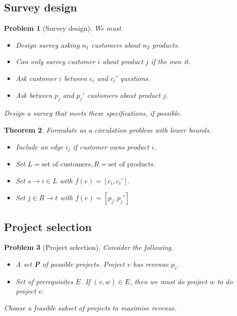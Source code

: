 \documentclass[10pt, oneside, reqno]{amsart}
\theoremstyle{plain}%
\newtheorem{thm}{Theorem}[section]
\newtheorem{prob}[thm]{Problem}
\theoremstyle{definition}
\theoremstyle{remark}
\begin{document}
\subsection{Survey design} %
\label{sub:survey_design}

\begin{prob}[Survey design] We must
	\begin{itemize}
		\item Design survey asking $n_1$ customers about $n_2$ products.
		\item Can only survey customer $i$ about product $j$ if the own it.
		\item Ask customer $i$ between $c_i$ and $c_i'$ questions.
		\item Ask between $p_j$ and $p_j'$ customers about product $j$.
	\end{itemize}
	
	Design a survey that meets these specifications, if possible.
\end{prob}

\begin{thm}
	Formulate as a circulation problem with lower bounds.
	\begin{itemize}
		\item Include an edge $i_j$ if customer owns product $i$.  
		\item Set $L = \text{set of customers}, R = \text{set of products}$.
		\item Set $s \rightarrow i \in L$ with $f(e) = [c_i, c_i']$.
		\item Set $j \in R \rightarrow t$ with $f(e) = [p_j, p_j']$
	\end{itemize}
\end{thm}




\subsection{Project selection} %
\label{sub:project_selection}


\begin{prob}[Project selection]
	Consider the following.
	\begin{itemize}
		\item A set \textbf{P} of possible projects.  Project $v$ has revenue $p_v$.
		\item Set of prerequisites $E$.  If $(v,w) \in E$, then we must do project $w$ to do project $v$.  
	\end{itemize}
	
	Choose a feasible subset of projects to maximise revenue.
\end{prob}
\end{document}
